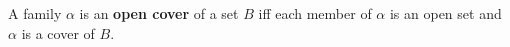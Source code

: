 A family $\alpha$ is an \textbf{open cover} of a set $B$ iff each member of $\alpha$ is an open set and $\alpha$ is a cover of $B$.
